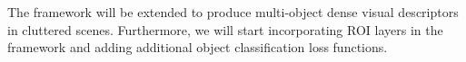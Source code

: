 The framework will be extended to produce multi-object dense visual descriptors in cluttered scenes.
Furthermore, we will start incorporating ROI layers in the framework and adding additional object classification loss functions.

